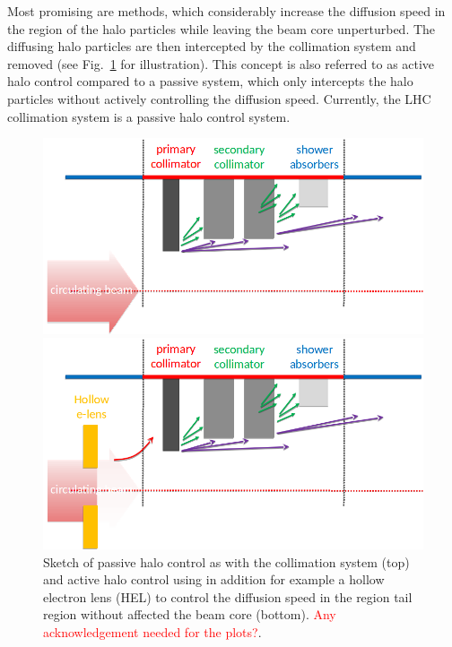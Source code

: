 \documentclass[%
 reprint,
 amsmath,amssymb,
 aps,
prstab,
]{revtex4-1}
\begin{document}
Most promising are methods, which considerably increase the diffusion speed in the region of the halo particles while leaving the beam core unperturbed. The diffusing halo particles are then intercepted by the collimation system and removed (see Fig.~\ref{fig:active_halo_control} for illustration). This concept is also referred to as active halo control compared to a passive system, which only intercepts the halo particles without actively controlling the diffusion speed. Currently, the LHC collimation system is a passive halo control system. 
\begin{figure}[h]
	\begin{minipage}[t]{0.49\linewidth}
		\centering
		\includegraphics[width=1.0\linewidth]{passive_halo_control.png}
	\end{minipage}
	\begin{minipage}[t]{0.49\linewidth}
		\centering
		\includegraphics[width=1.0\linewidth]{active_halo_control.png}
	\end{minipage}	
	\caption{\label{fig:active_halo_control} Sketch of passive halo control as with the collimation system (top) and active halo control using in addition for example a hollow electron lens (HEL) to control the diffusion speed in the region tail region without affected the beam core (bottom). \textcolor{red}{Any acknowledgement needed for the plots?}.}
\end{figure}
\end{document}
